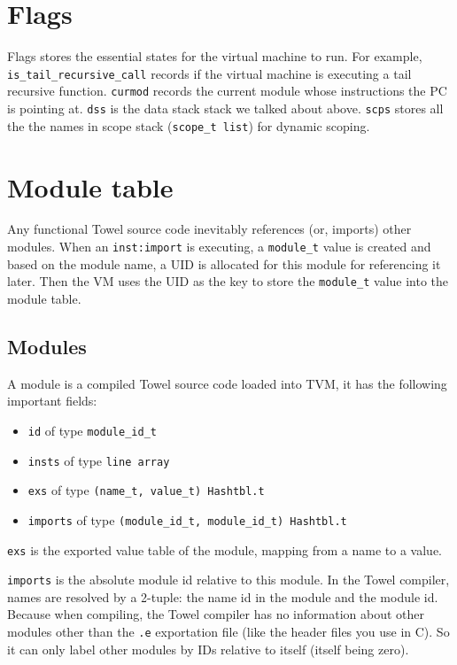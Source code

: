\documentclass{report}
\newcommand{\inst}[1] {\texttt{inst:#1}}
\begin{document}
\section{Flags}

Flags stores the essential states for the virtual machine to run. For example, \texttt{is\_tail\_recursive\_call} records if the virtual machine is executing a tail recursive function. \texttt{curmod} records the current module whose instructions the PC is pointing at. \texttt{dss} is the data stack stack we talked about above. \texttt{scps} stores all the the names in scope stack (\texttt{scope\_t list}) for dynamic scoping.

\section{Module table}

Any functional Towel source code inevitably references (or, imports) other modules. When an \inst{import} is executing, a \texttt{module\_t} value is created and based on the module name, a UID is allocated for this module for referencing it later. Then the VM uses the UID as the key to store the \texttt{module\_t} value into the module table.

\subsection{Modules}

A module is a compiled Towel source code loaded into TVM, it has the following important fields:
\begin{itemize}
\item \texttt{id} of type \texttt{module\_id\_t}
\item \texttt{insts} of type \texttt{line array}
\item \texttt{exs} of type \texttt{(name\_t, value\_t) Hashtbl.t}
\item \texttt{imports} of type \texttt{(module\_id\_t, module\_id\_t) Hashtbl.t}
\end{itemize}

\texttt{exs} is the exported value table of the module, mapping from a name to a value.

\texttt{imports} is the absolute module id relative to this module. In the Towel compiler, names are resolved by a 2-tuple: the name id in the module and the module id. Because when compiling, the Towel compiler has no information about other modules other than the \texttt{.e} exportation file (like the header files you use in C). So it can only label other modules by IDs relative to itself (itself being zero).
\end{document}
